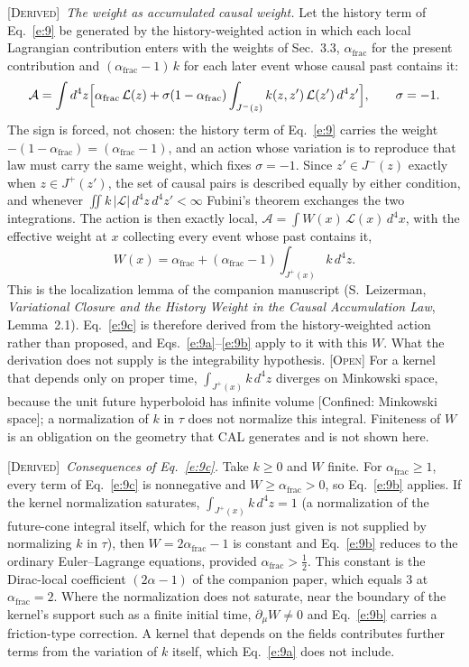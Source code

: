 \documentclass[10pt]{article}
\newcommand{\afrac}{\alpha_{\mathrm{frac}}}
\newcommand{\Derived}{\noindent\textsc{[Derived]}\ }
\begin{document}
\smallskip
\Derived \textit{The weight as accumulated causal weight.} Let the history term of Eq.~\eqref{e:9} be generated by the history-weighted action in which each local Lagrangian contribution enters with the weights of Sec.~3.3, $\afrac$ for the present contribution and $(\afrac-1)\,k$ for each later event whose causal past contains it:
\begin{equation*}
\mathcal A=\int d^4z\Bigl[\afrac\,\mathcal L(z)+\sigma(1-\afrac)\int_{J^-(z)}k(z,z')\,\mathcal L(z')\,d^4z'\Bigr],\qquad \sigma=-1 .
\end{equation*}
The sign is forced, not chosen: the history term of Eq.~\eqref{e:9} carries the weight $-(1-\afrac)=(\afrac-1)$, and an action whose variation is to reproduce that law must carry the same weight, which fixes $\sigma=-1$. Since $z'\in J^-(z)$ exactly when $z\in J^+(z')$, the set of causal pairs is described equally by either condition, and whenever $\iint k\,|\mathcal L|\,d^4z\,d^4z'<\infty$ Fubini's theorem exchanges the two integrations. The action is then exactly local, $\mathcal A=\int W(x)\,\mathcal L(x)\,d^4x$, with the effective weight at $x$ collecting every event whose past contains it,
\begin{equation}
W(x)=\afrac+(\afrac-1)\int_{J^+(x)}k\,d^4z.\label{e:9c}
\end{equation}
This is the localization lemma of the companion manuscript (S.~Leizerman, \textit{Variational Closure and the History Weight in the Causal Accumulation Law}, Lemma~2.1). Eq.~\eqref{e:9c} is therefore derived from the history-weighted action rather than proposed, and Eqs.~\eqref{e:9a}--\eqref{e:9b} apply to it with this $W$. What the derivation does not supply is the integrability hypothesis. \textsc{[Open]} For a kernel that depends only on proper time, $\int_{J^+(x)}k\,d^4z$ diverges on Minkowski space, because the unit future hyperboloid has infinite volume [Confined: Minkowski space]; a normalization of $k$ in $\tau$ does not normalize this integral. Finiteness of $W$ is an obligation on the geometry that CAL generates and is not shown here.

\smallskip
\Derived \textit{Consequences of Eq.~\eqref{e:9c}.} Take $k\ge0$ and $W$ finite. For $\afrac\ge1$, every term of Eq.~\eqref{e:9c} is nonnegative and $W\ge\afrac>0$, so Eq.~\eqref{e:9b} applies. If the kernel normalization saturates, $\int_{J^+(x)}k\,d^4z=1$ (a normalization of the future-cone integral itself, which for the reason just given is not supplied by normalizing $k$ in $\tau$), then $W=2\afrac-1$ is constant and Eq.~\eqref{e:9b} reduces to the ordinary Euler--Lagrange equations, provided $\afrac>\frac12$. This constant is the Dirac-local coefficient $(2\alpha-1)$ of the companion paper, which equals $3$ at $\afrac=2$. Where the normalization does not saturate, near the boundary of the kernel's support such as a finite initial time, $\partial_\mu W\neq0$ and Eq.~\eqref{e:9b} carries a friction-type correction. A kernel that depends on the fields contributes further terms from the variation of $k$ itself, which Eq.~\eqref{e:9a} does not include.
\end{document}
